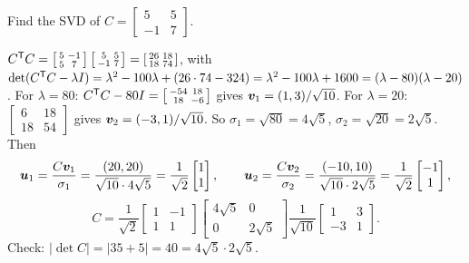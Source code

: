 \begin{exercise}\label{exr:u33-C}
Find the SVD of $C=\left[\begin{smallmatrix}5&5\\-1&7\end{smallmatrix}\right]$.
\end{exercise}
\begin{solution}
$C^{\mathsf{T}} C=\left[\begin{smallmatrix}5&-1\\5&7\end{smallmatrix}\right]\left[\begin{smallmatrix}5&5\\-1&7\end{smallmatrix}\right]
=\left[\begin{smallmatrix}26&18\\18&74\end{smallmatrix}\right]$, with
$\det(C^{\mathsf{T}} C-\lambda I)=\lambda^2-100\lambda+(26\cdot74-324)=\lambda^2-100\lambda+1600=(\lambda-80)(\lambda-20)$.
For $\lambda=80$: $C^{\mathsf{T}} C-80I=\left[\begin{smallmatrix}-54&18\\18&-6\end{smallmatrix}\right]$ gives
$\boldsymbol{v}_1=(1,3)/\sqrt{10}$. For $\lambda=20$: $\left[\begin{smallmatrix}6&18\\18&54\end{smallmatrix}\right]$ gives
$\boldsymbol{v}_2=(-3,1)/\sqrt{10}$. So $\sigma_1=\sqrt{80}=4\sqrt5$, $\sigma_2=\sqrt{20}=2\sqrt5$. Then
\[
  \boldsymbol{u}_1=\frac{C\boldsymbol{v}_1}{\sigma_1}=\frac{(20,20)}{\sqrt{10}\cdot4\sqrt5}=\frac{1}{\sqrt2}\begin{bmatrix}1\\1\end{bmatrix},\qquad
  \boldsymbol{u}_2=\frac{C\boldsymbol{v}_2}{\sigma_2}=\frac{(-10,10)}{\sqrt{10}\cdot2\sqrt5}=\frac{1}{\sqrt2}\begin{bmatrix}-1\\1\end{bmatrix},
\]
\[
  C=\frac{1}{\sqrt2}\begin{bmatrix}1&-1\\1&1\end{bmatrix}
    \begin{bmatrix}4\sqrt5&0\\0&2\sqrt5\end{bmatrix}
    \frac{1}{\sqrt{10}}\begin{bmatrix}1&3\\-3&1\end{bmatrix}.
\]
Check: $|\det C|=|35+5|=40=4\sqrt5\cdot2\sqrt5$.
\end{solution}
